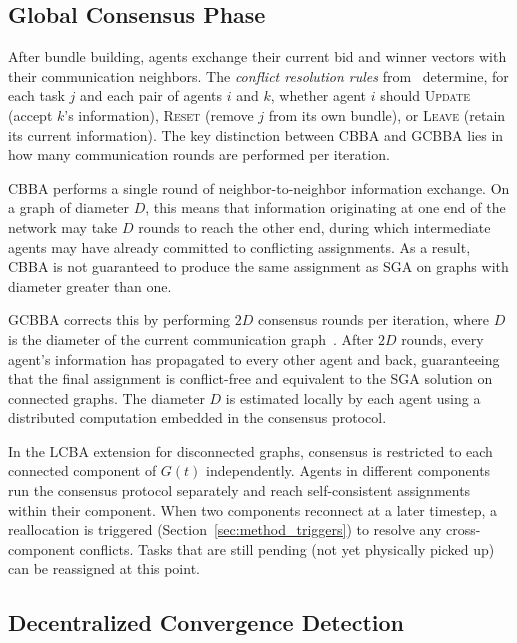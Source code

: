 \subsection{Global Consensus Phase}
\label{subsec:method_consensus}

After bundle building, agents exchange their current bid and winner vectors with
their communication neighbors.
The \emph{conflict resolution rules} from~\cite{choi2009consensus,kha2025enhancing}
determine, for each task $j$ and each pair of agents $i$ and $k$, whether
agent $i$ should \textsc{Update} (accept $k$'s information), \textsc{Reset}
(remove $j$ from its own bundle), or \textsc{Leave} (retain its current
information).
The key distinction between CBBA and GCBBA lies in how many communication
rounds are performed per iteration.

CBBA performs a single round of neighbor-to-neighbor information exchange.
On a graph of diameter $D$, this means that information originating at one end
of the network may take $D$ rounds to reach the other end, during which
intermediate agents may have already committed to conflicting assignments.
As a result, CBBA is not guaranteed to produce the same assignment as SGA on
graphs with diameter greater than one.

GCBBA corrects this by performing $2D$ consensus rounds per iteration, where
$D$ is the diameter of the current communication graph~\cite{kha2025enhancing}.
After $2D$ rounds, every agent's information has propagated to every other agent
and back, guaranteeing that the final assignment is conflict-free and equivalent
to the SGA solution on connected graphs.
The diameter $D$ is estimated locally by each agent using a distributed
computation embedded in the consensus protocol.

In the LCBA extension for disconnected graphs, consensus is restricted to each
connected component of $G(t)$ independently.
Agents in different components run the consensus protocol separately and reach
self-consistent assignments within their component.
When two components reconnect at a later timestep, a reallocation is triggered
(Section~\ref{sec:method_triggers}) to resolve any cross-component conflicts.
Tasks that are still pending (not yet physically picked up) can be reassigned
at this point.


\subsection{Decentralized Convergence Detection}
\label{subsec:method_convergence}

